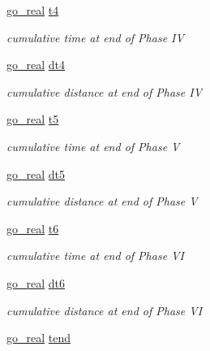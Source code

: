\begin{DoxyCompactItemize}
\hyperlink{gotypes_8h_afd666a2393eebd71ee455846ac9def9b}{go\-\_\-real} \hyperlink{structgomotion_1_1go__traj__cj__spec_a711070fd99aab23d3261766a63b6f95a}{t4}
\begin{DoxyCompactList}\small\item\em cumulative time at end of Phase I\-V \end{DoxyCompactList}\item 
\hyperlink{gotypes_8h_afd666a2393eebd71ee455846ac9def9b}{go\-\_\-real} \hyperlink{structgomotion_1_1go__traj__cj__spec_a8a1e7c17e97314f0e6f274b1689a5b1b}{dt4}
\begin{DoxyCompactList}\small\item\em cumulative distance at end of Phase I\-V \end{DoxyCompactList}\item 
\hyperlink{gotypes_8h_afd666a2393eebd71ee455846ac9def9b}{go\-\_\-real} \hyperlink{structgomotion_1_1go__traj__cj__spec_a79eb62ae848478fe0c1e7d2ee2a1318f}{t5}
\begin{DoxyCompactList}\small\item\em cumulative time at end of Phase V \end{DoxyCompactList}\item 
\hyperlink{gotypes_8h_afd666a2393eebd71ee455846ac9def9b}{go\-\_\-real} \hyperlink{structgomotion_1_1go__traj__cj__spec_ada0fa456052e5a86ffeb2e4e7bd3790d}{dt5}
\begin{DoxyCompactList}\small\item\em cumulative distance at end of Phase V \end{DoxyCompactList}\item 
\hyperlink{gotypes_8h_afd666a2393eebd71ee455846ac9def9b}{go\-\_\-real} \hyperlink{structgomotion_1_1go__traj__cj__spec_a69a0040de9aa54ab300c81b57f2c305e}{t6}
\begin{DoxyCompactList}\small\item\em cumulative time at end of Phase V\-I \end{DoxyCompactList}\item 
\hyperlink{gotypes_8h_afd666a2393eebd71ee455846ac9def9b}{go\-\_\-real} \hyperlink{structgomotion_1_1go__traj__cj__spec_ac9046b535c1e0a5d68570b077af1bce0}{dt6}
\begin{DoxyCompactList}\small\item\em cumulative distance at end of Phase V\-I \end{DoxyCompactList}\item 
\hyperlink{gotypes_8h_afd666a2393eebd71ee455846ac9def9b}{go\-\_\-real} \hyperlink{structgomotion_1_1go__traj__cj__spec_ad600b88856946fb0a27d9ba95128814f}{tend}

\end{DoxyCompactItemize}
